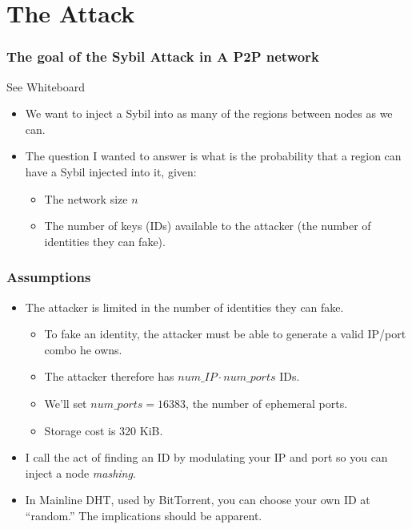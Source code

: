 \documentclass[11pt]{beamer}
\begin{document}
	
    
    
    \section{The Attack}
   	
       \begin{frame}
           \frametitle{The goal of the Sybil Attack in A P2P network}
           See Whiteboard
           \begin{itemize}
           \item We want to inject a Sybil into as many of the regions between nodes as we can.
             \item The question I wanted to answer is what is the probability that a region can have a Sybil injected into it, given:
             \begin{itemize}
                 \item The network size $n$
                 \item The number of keys (IDs) available to the attacker (the number of identities they can fake).
              \end{itemize}
            \end{itemize}
        \end{frame} 
       
       \begin{frame}
        \frametitle{Assumptions}
        \begin{itemize}
            \item The attacker is limited in the number of identities they can fake.
            
            \begin{itemize}
                \item To fake an identity, the attacker must be able to generate a valid IP/port combo he owns.
                \item The attacker therefore has $num\_IP \cdot num\_ports$ IDs.
                \item We'll set $ num\_ports = 16383 $, the number of ephemeral ports.
                \item Storage cost is 320 KiB.
            \end{itemize}
            \item I call the act of finding an ID by modulating your IP and port so you can inject a node \emph{mashing}.
            \item In Mainline DHT, used by BitTorrent, you can choose your own ID at ``random.''   The implications should be apparent.
            
            \end{itemize}
    	\end{frame}
\end{document}
